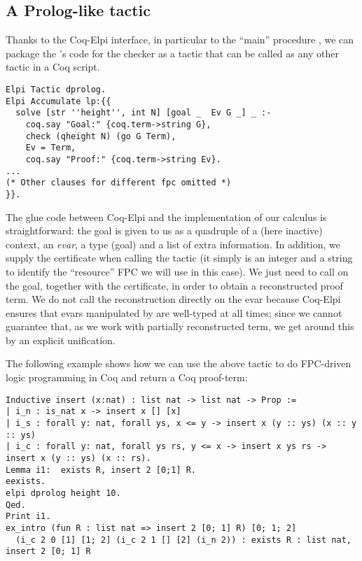 

\subsection{A Prolog-like tactic}

Thanks to the Coq-Elpi interface, in particular to the ``main''
procedure , we can package the \lP's code for the checker
as a tactic that can be called as any other tactic in a Coq script.

\begin{lstlisting}[deletekeywords={goal}]
Elpi Tactic dprolog.
Elpi Accumulate lp:{{
  solve [str ''height'', int N] [goal _  Ev G _] _ :-
    coq.say "Goal:" {coq.term->string G},
    check (qheight N) (go G Term),
    Ev = Term,
    coq.say "Proof:" {coq.term->string Ev}.
...
(* Other clauses for different fpc omitted *)
}}.
\end{lstlisting}

The glue code between Coq-Elpi and the implementation of our calculus
is straightforward: the goal is given to us as a quadruple of a (here
inactive) context, an \emph{evar}, a type (goal) and a list of extra
information. In addition, we supply the certificate  when calling the tactic (it simply is an integer and a string to
identify the ``resource'' FPC we will use in this case). We just need
to call  on the goal, together with the
certificate, in order to obtain a reconstructed proof term. We do not
call the reconstruction directly on the evar because Coq-Elpi
ensures that evars manipulated by \lP are well-typed at all times; since
we cannot guarantee that, as we work with partially reconstructed
term, we  get  around this by an explicit unification.

The following
example shows how we can use the above tactic to do FPC-driven logic
programming in Coq and return a Coq proof-term:
\begin{lstlisting}
Inductive insert (x:nat) : list nat -> list nat -> Prop :=
| i_n : is_nat x -> insert x [] [x]
| i_s : forall y: nat, forall ys, x <= y -> insert x (y :: ys) (x :: y :: ys)
| i_c : forall y: nat, forall ys rs, y <= x -> insert x ys rs -> insert x (y :: ys) (x :: rs).
Lemma i1:  exists R, insert 2 [0;1] R.
eexists.
elpi dprolog height 10.
Qed.
Print i1.
ex_intro (fun R : list nat => insert 2 [0; 1] R) [0; 1; 2]
  (i_c 2 0 [1] [1; 2] (i_c 2 1 [] [2] (i_n 2)) : exists R : list nat, insert 2 [0; 1] R
\end{lstlisting}

